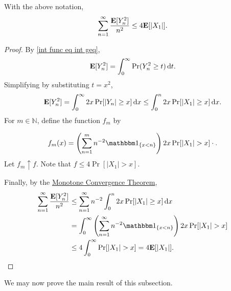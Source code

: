 \begin{lemma}
\label{prlem2etem}
    With the above notation,
    $$\sum_{n=1}^\infty \frac{\textbf{E}[Y_n^2]}{n^2}\leq 4\textbf{E}[|X_1|].$$
\end{lemma}
\begin{proof}
    By \cref{int func eq int geq},
    $$\textbf{E}[Y_n^2]=\int_0^\infty \Pr(Y_n^2\geq t)\operatorname{d}\!{t}.$$
    Simplifying by substituting $t=x^2$,
    $$\textbf{E}[Y_n^2] = \int_0^\infty 2x\Pr[|Y_n|\geq x]\operatorname{d}\!{x}\leq \int_0^n 2x\Pr[|X_1|\geq x]\operatorname{d}\!{x}.$$
    For $m\in\mathbb{N}$, define the function $f_m$ by
    
    $$f_m(x) = \left(\sum_{n=1}^m n^{-2}\indic_{\{x<n\}}\right)2x\Pr[|X_1|>x]\cdot.$$
    Let $f_m\uparrow f$. Note that $f\leq 4\Pr[|X_1|>x]$.
    
    Finally, by the \hyperref[Monotone Convergence Theorem]{Monotone Convergence Theorem},
    \begin{align*}
        \sum_{n=1}^\infty \frac{\expec[Y_n^2]}{n^2} &\leq \sum_{n=1}^\infty n^{-2} \int_0^n 2x\Pr[|X_1|\geq x]\d x \\
        &= \int_0^\infty \left(\sum_{n=1}^\infty n^{-2}\indic_{\{x<n\}}\right) 2x\Pr[|X_1|>x] \\
        &\leq 4\int_0^\infty \Pr[|X_1|>x] = 4\expec[|X_1|].
    \end{align*}
\end{proof}

We may now prove the main result of this subsection.

